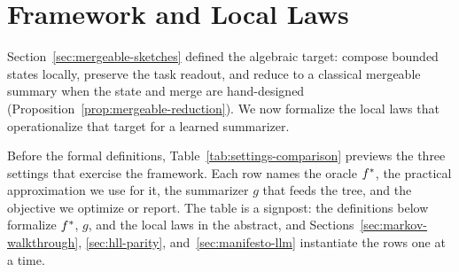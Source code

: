 \section{Framework and Local Laws}\label{sec:framework}

Section~\ref{sec:mergeable-sketches} defined the algebraic target:
compose bounded states locally, preserve the task readout, and reduce to a
classical mergeable summary when the state and merge are hand-designed
(Proposition~\ref{prop:mergeable-reduction}). We now formalize the local
laws that operationalize that target for a learned summarizer.

Before the formal definitions, Table~\ref{tab:settings-comparison} previews the three settings that exercise the framework. Each row names the oracle $f^\ast$, the practical approximation we use for it, the summarizer $g$ that feeds the tree, and the objective we optimize or report. The table is a signpost: the definitions below formalize $f^\ast$, $g$, and the local laws in the abstract, and Sections~\ref{sec:markov-walkthrough}, \ref{sec:hll-parity}, and~\ref{sec:manifesto-llm} instantiate the rows one at a time.

